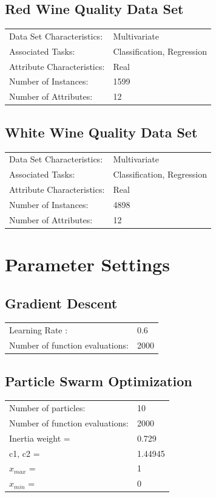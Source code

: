 \documentclass[11pt, a4paper]{report}
\begin{document}
\subsection{Red Wine Quality Data Set}
\begin{tabular}{l l}
	Data Set Characteristics:  & Multivariate \\
	Associated Tasks: & Classification, Regression  \\
	Attribute Characteristics: & Real \\
	Number of Instances: & 1599 \\
	Number of Attributes: & 12 \\
\end{tabular}

\subsection{White Wine Quality Data Set}
\begin{tabular}{l l}
	Data Set Characteristics:  & Multivariate \\
	Associated Tasks: & Classification, Regression  \\
	Attribute Characteristics: & Real \\
	Number of Instances: & 4898 \\
	Number of Attributes: & 12 \\
\end{tabular}

\section{Parameter Settings}
\subsection{Gradient Descent}
\begin{tabular}{l l}
	Learning Rate \alpha: & 0.6 \\
	Number of function evaluations: & 2000 \\ 
\end{tabular}

\subsection{Particle Swarm Optimization}
\begin{tabular}{l l}
	Number of particles: & 10 \\
	Number of function evaluations: & 2000 \\ 
	Inertia weight = & 0.729 \\
	c1, c2 = & 1.44945 \\
	$ x_{max} $ = & 1 \\
	$ x_{min} $ = & 0 \\
\end{tabular}
\end{document}
